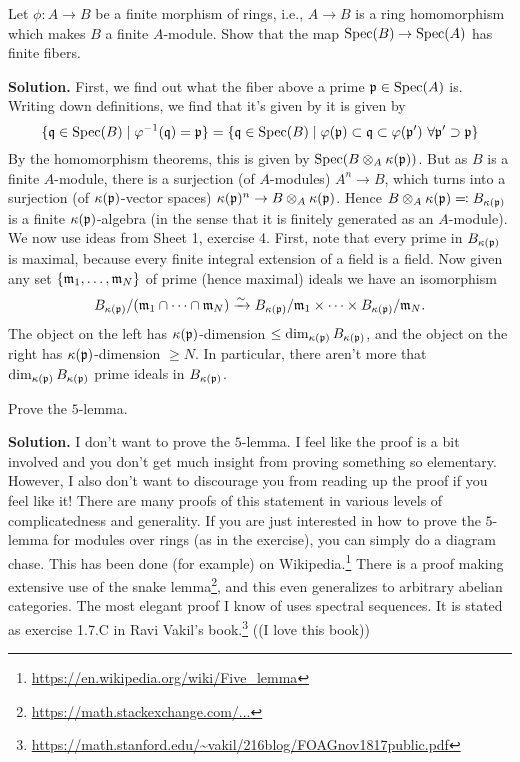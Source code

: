 \documentclass[a4paper,11pt]{article}
\begin{document}
Let $\phi: A \to B$ be a finite morphism of rings, i.e., $A \to B$ is a ring homomorphism
which makes $B$ a finite $A$-module. Show that the map $\operatorname{Spec}(B)\to\operatorname{Spec}(A)$
has finite fibers.

\textbf{Solution.} 
First, we find out what the fiber above a prime $\mathfrak{p} \in \operatorname{Spec}(A)$ is. Writing down definitions, we find that it's given by
it is given by 
\begin{equation*}
    \{\mathfrak{q} \in \operatorname{Spec}(B) \mid \varphi^{-1}(\mathfrak{q}) = \mathfrak{p}\} = \{\mathfrak{q} \in \operatorname{Spec}(B) \mid
    \varphi(\mathfrak{p}) \subset \mathfrak{q} \subset \varphi(\mathfrak{p}') \  \forall \mathfrak{p}' \supset \mathfrak{p} \}
\end{equation*}
By the homomorphism theorems, this is given by $\operatorname{Spec}( B \otimes_A \kappa(\mathfrak{p}) )$.
But as $B$ is a finite $A$-module, there is a surjection (of $A$-modules) $A^n
\to B$, which turns into
a surjection (of $\kappa(\mathfrak{p})$-vector spaces) $\kappa(\mathfrak{p})^n \to B \otimes_A
\kappa(\mathfrak{p})$. Hence $B \otimes_A \kappa(\mathfrak{p})
\eqqcolon B_{\kappa(\mathfrak{p})}$
is a finite $\kappa(\mathfrak{p})$-algebra (in the sense that it is finitely generated as an
$A$-module). We now use ideas from Sheet 1, exercise 4. First, note that every prime
in $B_{\kappa(\mathfrak{p})}$ is maximal, because every finite integral extension of a field
is a field. Now given any set $\{\mathfrak{m}_1, \dots, \mathfrak{m}_N\}$ of prime (hence maximal) ideals
we have an isomorphism
\begin{equation*}
    B_{\kappa(\mathfrak{p})}/(\mathfrak{m}_1 \cap \dots \cap \mathfrak{m}_N) \xrightarrow{\sim} B_{\kappa(\mathfrak{p})}/\mathfrak{m}_1 \times \dots \times B_{\kappa(\mathfrak{p})}/\mathfrak{m}_N.
\end{equation*}
The object on the left has $\kappa(\mathfrak{p})$-dimension $\leq \dim_{\kappa(\mathfrak{p})}
B_{\kappa(\mathfrak{p})}$, and the object on the right has $\kappa(\mathfrak{p})$-dimension 
$\geq N$. In particular, there aren't more that $\dim_{\kappa(\mathfrak{p})} B_{\kappa(\mathfrak{p})}$ prime ideals
in $B_{\kappa(\mathfrak{p})}$. 

Prove the $5$-lemma.

\textbf{Solution.}
I don't want to prove the $5$-lemma. I feel like the proof is a bit
involved and you don't get much insight from proving something so elementary.
However, I also don't want to discourage you from reading up the proof if you
feel like it! There are many proofs of this statement in various levels of
complicatedness and generality. If you are just interested in how to prove the
$5$-lemma for modules over rings (as in the exercise), you can simply do a
diagram chase. This has been done (for example) on
Wikipedia.\footnote{\url{https://en.wikipedia.org/wiki/Five_lemma}}
There is a proof making extensive use of the snake
lemma\footnote{\href{https://math.stackexchange.com/questions/2508678/proving-the-strong-four-lemma-using-the-snake-lemma}{https://math.stackexchange.com/...}},
and this even generalizes to arbitrary abelian categories.
The most elegant proof I know of uses spectral sequences. It is stated as 
exercise 1.7.C in Ravi Vakil's
book.\footnote{\url{https://math.stanford.edu/~vakil/216blog/FOAGnov1817public.pdf}
} ((I love this book))

\contactend
\end{document}
